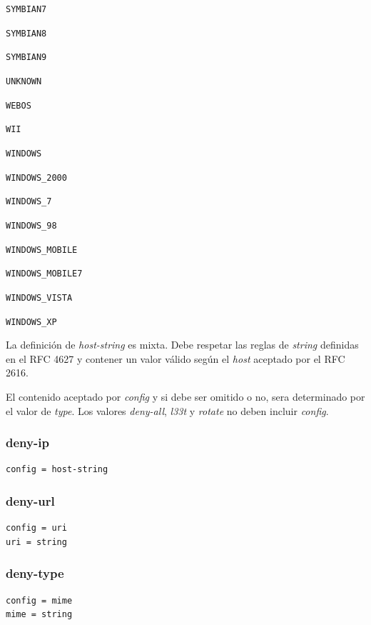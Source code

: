 \documentclass[11pt,a4paper,titlepage]{article}
\begin{document}
\begin{multicols}{4}
    \small \texttt{SYMBIAN7}

    \small \texttt{SYMBIAN8}

    \small \texttt{SYMBIAN9}

    \small \texttt{UNKNOWN}

    \small \texttt{WEBOS}

    \small \texttt{WII}

    \small \texttt{WINDOWS}

    \small \texttt{WINDOWS\_2000}

    \small \texttt{WINDOWS\_7}

    \small \texttt{WINDOWS\_98}

    \small \texttt{WINDOWS\_MOBILE}

    \small \texttt{WINDOWS\_MOBILE7}

    \small \texttt{WINDOWS\_VISTA}

    \small \texttt{WINDOWS\_XP}

\end{multicols}


La definición de \textit{host-string} es mixta.
Debe respetar las reglas de \textit{string} definidas en el RFC 4627 y contener un valor válido según el \textit{host} aceptado por el RFC 2616.

El contenido aceptado por \textit{config} y si debe ser omitido o no, sera determinado por el valor de \textit{type}.
Los valores \textit{deny-all}, \textit{l33t} y \textit{rotate} no deben incluir \textit{config}.
\subsubsection{deny-ip}
\begin{verbatim}
config = host-string
\end{verbatim}

\subsubsection{deny-url}
\begin{verbatim}
config = uri
uri = string
\end{verbatim}

\subsubsection{deny-type}
\begin{verbatim}
config = mime
mime = string
\end{verbatim}
\end{document}
